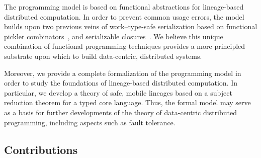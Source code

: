\documentclass{jfp1}
\begin{document}
The programming model is based on functional abstractions for lineage-based
distributed computation. In order to prevent common usage errors, the model
builds upon two previous veins of work--type-safe serialization based on
functional pickler combinators~\cite{Kennedy2004,Elsman2005,Pickling,AliceML}, and
serializable closures~\cite{CloudHaskell,Spores}. We believe this unique
combination of functional programming techniques provides a more principled
substrate upon which to build data-centric, distributed systems.

Moreover, we provide a complete formalization of the programming model in order
to study the foundations of lineage-based distributed computation. In
particular, we develop a theory of safe, mobile lineages based on a subject
reduction theorem for a typed core language. Thus, the formal model may serve as
a basis for further developments of the theory of data-centric distributed
programming, including aspects such as fault tolerance.

\subsection{Contributions}
\end{document}
